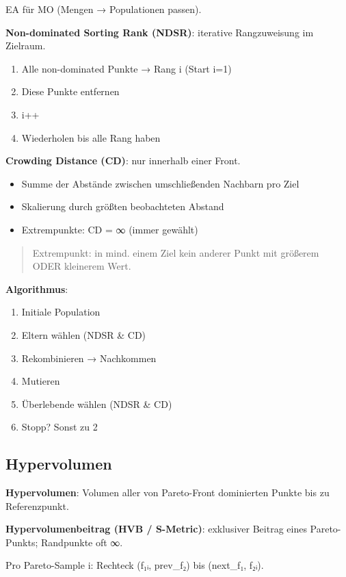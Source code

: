\documentclass[11pt, a4paper]{article}
\begin{document}
EA für MO (Mengen → Populationen passen).


\textbf{Non-dominated Sorting Rank (NDSR)}: iterative Rangzuweisung im Zielraum.

\begin{enumerate}
  \item Alle non-dominated Punkte → Rang i (Start i=1)
  \item Diese Punkte entfernen
  \item i++
  \item Wiederholen bis alle Rang haben
\end{enumerate}

\textbf{Crowding Distance (CD)}: nur innerhalb einer Front.

\begin{itemize}
  \item Summe der Abstände zwischen umschließenden Nachbarn pro Ziel
  \item Skalierung durch größten beobachteten Abstand
  \item Extrempunkte: CD = ∞ (immer gewählt)
\end{itemize}

\begin{quote}
Extrempunkt: in mind. einem Ziel kein anderer Punkt mit größerem ODER kleinerem Wert.
\end{quote}

\textbf{Algorithmus}:

\begin{enumerate}
  \item Initiale Population
  \item Eltern wählen (NDSR \& CD)
  \item Rekombinieren → Nachkommen
  \item Mutieren
  \item Überlebende wählen (NDSR \& CD)
  \item Stopp? Sonst zu 2
\end{enumerate}


\subsection{Hypervolumen}

\textbf{Hypervolumen}: Volumen aller von Pareto-Front dominierten Punkte bis zu Referenzpunkt.

\textbf{Hypervolumenbeitrag (HVB / S-Metric)}: exklusiver Beitrag eines Pareto-Punkts; Randpunkte oft ∞.


Pro Pareto-Sample i: Rechteck (f₁ᵢ, prev\_f₂) bis (next\_f₁, f₂ᵢ).
\end{document}
